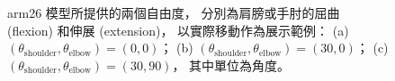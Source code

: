 \begin{figure}[!ht]
	\centering
    \caption[arm26 模型之自由度介紹]{arm26 模型所提供的兩個自由度，
                                    分別為肩膀或手肘的屈曲 (flexion) 和伸展 (extension)，
                                    以實際移動作為展示範例：
                                    (a) $(\theta_\mathrm{shoulder}, \theta_\mathrm{elbow})=(0,0)$；
                                    (b) $(\theta_\mathrm{shoulder}, \theta_\mathrm{elbow})=(30,0)$；
                                    (c) $(\theta_\mathrm{shoulder}, \theta_\mathrm{elbow})=(30,90)$，
                                    其中單位為角度。}
    \label{ch4_fig_arm26Dof}
\end{figure}

